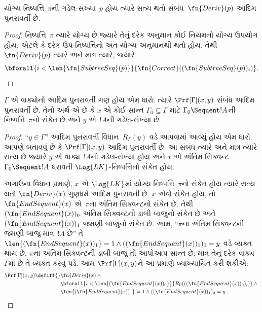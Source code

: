 \begin{prop}
  યોગ્ય નિષ્પત્તિ~$\pi$ની
  ગડેલ-સંખ્યા~$p$ હોય ત્યારે સત્ય
  થતો સંબંધ~$\fn{Deriv}(p)$ આદિમ
  પુનરાવર્તી છે.
\end{prop}

\begin{proof}
  નિષ્પત્તિ~$\pi$ ત્યારે યોગ્ય
  છે જ્યારે તેનું દરેક અનુમાન કોઈ
  નિયમનો યોગ્ય ઉપયોગ હોય, એટલે કે
  દરેક ઉપ-નિષ્પત્તિનો અંત યોગ્ય
  અનુમાનથી થતો હોય. તેથી
  $\fn{Deriv}(p)$ ત્યારે અને માત્ર ત્યારે,
  જ્યારે
  \[
  \bforall{i<\len{\fn{SubtreeSeq}(p)}}{\fn{Correct}((\fn{SubtreeSeq}(p))_i)}.
  \]
\end{proof}


\begin{prop}
$\Gamma$ એ વાક્યોનો આદિમ
પુનરાવર્તી ગણ હોય એમ ધારો. ત્યારે
$\Prf[\Gamma](x, y)$ સંબંધ આદિમ
પુનરાવર્તી છે. તેનો અર્થ એ છે કે
$x$ એ કોઈ સાન્ત
$\Gamma_0 \subseteq \Gamma$ માટે
$\Gamma_0 \Sequent !A$ની
નિષ્પત્તિ~$\pi$નો સંકેત છે અને
$y$ એ~$!A$ની ગડેલ-સંખ્યા છે.
\end{prop}

\begin{proof}
``$y \in \Gamma$'' આદિમ પુનરાવર્તી
વિધાન~$R_\Gamma(y)$ વડે આપવામાં
આવ્યું હોય એમ ધારો. આપણે બતાવવું છે
કે $\Prf[\Gamma](x, y)$ આદિમ
પુનરાવર્તી છે. આ સંબંધ ત્યારે અને
માત્ર ત્યારે સત્ય છે જ્યારે $y$ એ
વાક્ય~$!A$ની ગડેલ-સંખ્યા
હોય અને $x$ એ અંતિમ સિક્વન્ટ
$\Gamma_0 \Sequent !A$ ધરાવતી
$\Log{LK}$-નિષ્પત્તિનો સંકેત હોય.

અગાઉના વિધાન પ્રમાણે, $x$ એ
$\Log{LK}$માં યોગ્ય
નિષ્પત્તિ~$\pi$નો સંકેત હોય
ત્યારે સત્ય થતો
$\fn{Deriv}(x)$ ગુણધર્મ આદિમ
પુનરાવર્તી છે. $x$ એવો સંકેત હોય,
તો $\fn{EndSequent}(x)$ એ~$\pi$ના
અંતિમ સિક્વન્ટનો સંકેત છે. તેથી
$(\fn{EndSequent}(x))_0$ અંતિમ
સિક્વન્ટની ડાબી બાજુનો સંકેત છે
અને $(\fn{EndSequent}(x))_1$
જમણી બાજુનો સંકેત છે. આમ,
``$\pi$ના અંતિમ સિક્વન્ટની જમણી
બાજુ માત્ર~$!A$ છે'' તે
$\len{(\fn{EndSequent}(x))_1} = 1
\land ((\fn{EndSequent}(x))_1)_0 = y$
વડે વ્યક્ત થાય છે.
$\pi$ના અંતિમ સિક્વન્ટની ડાબી
બાજુ તો આપોઆપ સાન્ત છે; માત્ર
તેનું દરેક વાક્ય~$\Gamma$માં છે
તે વ્યક્ત કરવું પડે. આમ
$\Prf[\Gamma](x, y)$ને આ પ્રમાણે
વ્યાખ્યાયિત કરી શકીએ:
\begin{align*}
\Prf[\Gamma](x, y) \defiff {}&
\fn{Deriv}(x) \land {} \\
& \bforall{i <
  \len{(\fn{EndSequent}(x))_0}}{R_\Gamma(((\fn{EndSequent}(x))_0)_i)} \land {}\\
& \len{(\fn{EndSequent}(x))_1} = 1 \land ((\fn{EndSequent}(x))_1)_0 = y.
\end{align*}
\end{proof}
\endgroup


